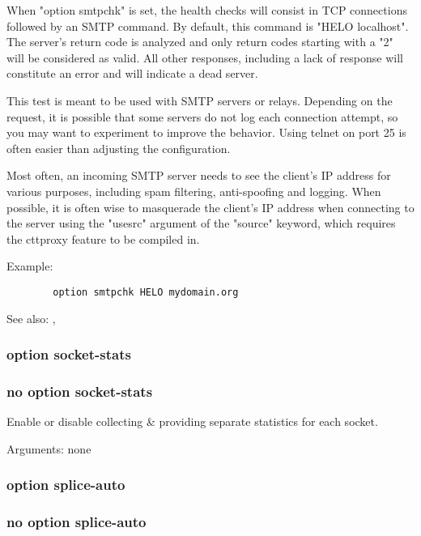   When "option smtpchk" is set, the health checks will consist in TCP
  connections followed by an SMTP command. By default, this command is
  "HELO localhost". The server's return code is analyzed and only return codes
  starting with a "2" will be considered as valid. All other responses,
  including a lack of response will constitute an error and will indicate a
  dead server.

  This test is meant to be used with SMTP servers or relays. Depending on the
  request, it is possible that some servers do not log each connection attempt,
  so you may want to experiment to improve the behavior. Using telnet on port
  25 is often easier than adjusting the configuration.

  Most often, an incoming SMTP server needs to see the client's IP address for
  various purposes, including spam filtering, anti-spoofing and logging. When
  possible, it is often wise to masquerade the client's IP address when
  connecting to the server using the "usesrc" argument of the "source" keyword,
  which requires the cttproxy feature to be compiled in.

  Example:
\begin{verbatim}
        option smtpchk HELO mydomain.org
\end{verbatim}

  See also: , 

\subsubsection{option socket-stats}
\subsubsection{no option socket-stats}


  Enable or disable collecting \& providing separate statistics for each socket.


  Arguments: none

\subsubsection{option splice-auto}
\subsubsection{no option splice-auto}

